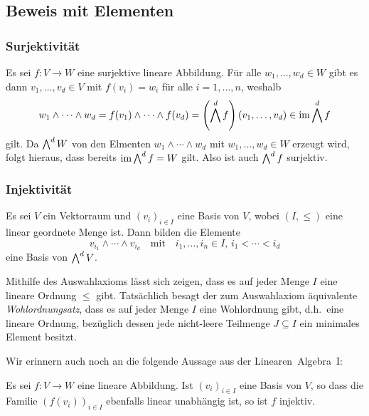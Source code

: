 \subsection{Beweis mit Elementen}



\subsubsection{Surjektivität}
Es sei $f \colon V \to W$ eine surjektive lineare Abbildung.
Für alle $w_1, \dotsc, w_d \in W$ gibt es dann $v_1, \dotsc, v_d \in V$ mit $f(v_i) = w_i$ für alle $i = 1, \dotsc, n$, weshalb
\[
      w_1 \wedge \dotsb \wedge w_d
  =   f(v_1) \wedge \dotsb \wedge f(v_d)
  =   \left(\bigwedge^{d} f\right)(v_1, \dotsc, v_d)
  \in \operatorname{im} \bigwedge^{d} f
\]
gilt.
Da $\bigwedge^{d} W$ von den Elmenten $w_1 \wedge \dotsb \wedge w_d$ mit $w_1, \dotsc, w_d \in W$ erzeugt wird, folgt hieraus, dass bereits $\operatorname{im} \bigwedge^{d} f = W$ gilt.
Also ist auch $\bigwedge^{d} f$ surjektiv.



\subsubsection{Injektivität}

\begin{proposition}
  Es sei $V$ ein Vektorraum und $(v_i)_{i \in I}$ eine Basis von $V$, wobei $(I, \leq)$ eine linear geordnete Menge ist.
  Dann bilden die Elemente
  \[
    v_{i_1} \wedge \dotsb \wedge v_{i_d}
    \quad\text{mit}\quad
    i_1, \dotsc, i_n \in I,
    \,
    i_1 < \dotsb < i_d
  \]
  eine Basis von $\bigwedge^{d} V$.
\end{proposition}

\begin{remark}
  Mithilfe des Auswahlaxioms lässt sich zeigen, dass es auf jeder Menge $I$ eine lineare Ordnung $\leq$ gibt.
  Tatsächlich besagt der zum Auswahlaxiom äquivalente \emph{Wohlordnungsatz}, dass es auf jeder Menge $I$ eine Wohlordnung gibt, d.h.\ eine lineare Ordnung, bezüglich dessen jede nicht-leere Teilmenge $J \subseteq I$ ein minimales Element besitzt.
\end{remark}

Wir erinnern auch noch an die folgende Aussage aus der Linearen~Algebra~I:

\begin{lemma}
  \label{lemma: checking injectivity on a basis}
  Es sei $f \colon V \to W$ eine lineare Abbildung.
  Ist $(v_i)_{i \in I}$ eine Basis von $V$, so dass die Familie $(f(v_i))_{i \in I}$ ebenfalls linear unabhängig ist, so ist $f$ injektiv.
\end{lemma}

